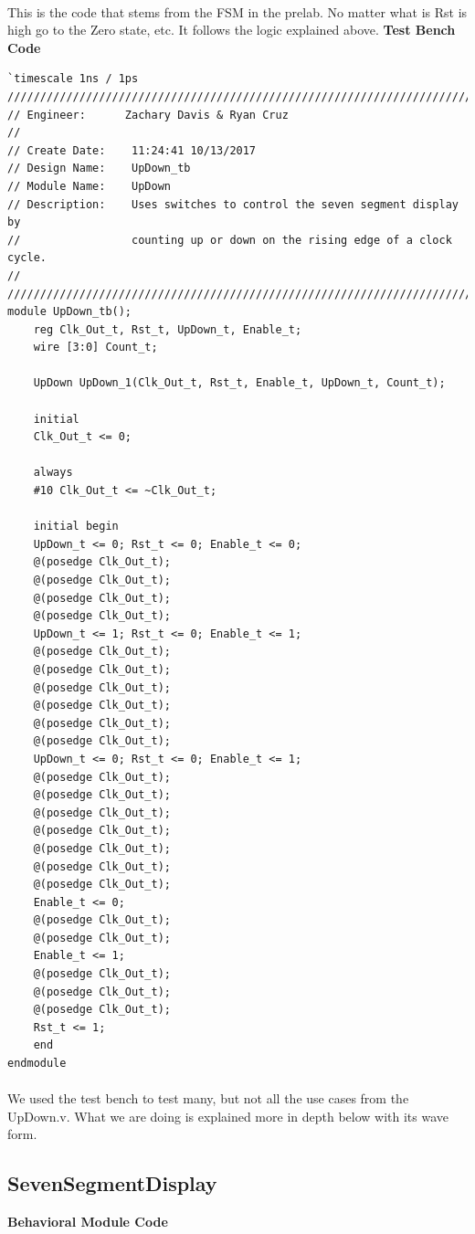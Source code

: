 \documentclass[12pt]{report}
\begin{document}
		\paragraph*{}
			This is the code that stems from the FSM in the prelab.  No matter what is Rst is 
			high go to the Zero state, etc.  It follows the logic explained above.
		\newpage
		\flushleft
		\textbf{Test Bench Code}
		\begin{Verbatim}[frame=single, fontsize=\small]
`timescale 1ns / 1ps
////////////////////////////////////////////////////////////////////////////////
// Engineer:      Zachary Davis & Ryan Cruz
// 
// Create Date:    11:24:41 10/13/2017 
// Design Name:    UpDown_tb
// Module Name:    UpDown  
// Description:    Uses switches to control the seven segment display by 
//                 counting up or down on the rising edge of a clock cycle.
//						 
////////////////////////////////////////////////////////////////////////////////
module UpDown_tb();
	reg Clk_Out_t, Rst_t, UpDown_t, Enable_t;
	wire [3:0] Count_t;
	
	UpDown UpDown_1(Clk_Out_t, Rst_t, Enable_t, UpDown_t, Count_t);
	
	initial
	Clk_Out_t <= 0;
	
	always
	#10 Clk_Out_t <= ~Clk_Out_t;
	
	initial begin
	UpDown_t <= 0; Rst_t <= 0; Enable_t <= 0;
	@(posedge Clk_Out_t);
	@(posedge Clk_Out_t);
	@(posedge Clk_Out_t);
	@(posedge Clk_Out_t);
	UpDown_t <= 1; Rst_t <= 0; Enable_t <= 1;
	@(posedge Clk_Out_t);
	@(posedge Clk_Out_t);
	@(posedge Clk_Out_t);
	@(posedge Clk_Out_t);
	@(posedge Clk_Out_t);
	@(posedge Clk_Out_t);
	UpDown_t <= 0; Rst_t <= 0; Enable_t <= 1;
	@(posedge Clk_Out_t);
	@(posedge Clk_Out_t);
	@(posedge Clk_Out_t);
	@(posedge Clk_Out_t);
	@(posedge Clk_Out_t);
	@(posedge Clk_Out_t);
	@(posedge Clk_Out_t);
	Enable_t <= 0;
	@(posedge Clk_Out_t);
	@(posedge Clk_Out_t);
	Enable_t <= 1;
	@(posedge Clk_Out_t);
	@(posedge Clk_Out_t);	
	@(posedge Clk_Out_t);
	Rst_t <= 1;
	end
endmodule
		\end{Verbatim}
		\paragraph*{}
			We used the test bench to test many, but not all the use cases from the UpDown.v.  
			What we are doing is explained more in depth below with its wave form.

	\subsection*{SevenSegmentDisplay}
	\textbf{Behavioral Module Code}
\end{document}
